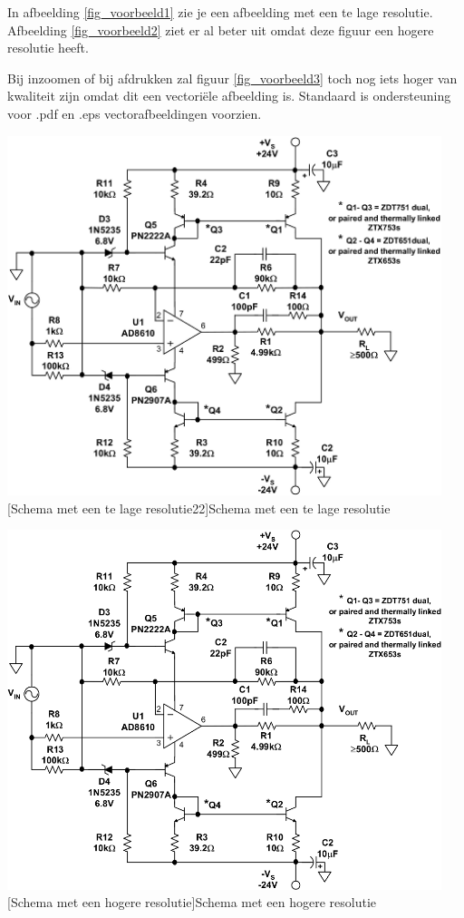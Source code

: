 In afbeelding \ref{fig_voorbeeld1} zie je een afbeelding met een te lage resolutie. Afbeelding \ref{fig_voorbeeld2} ziet er al beter uit omdat deze figuur een hogere resolutie heeft.

Bij inzoomen of bij afdrukken zal figuur \ref{fig_voorbeeld3} toch nog iets hoger van kwaliteit zijn omdat dit een vectori\"ele afbeelding is. 
Standaard is ondersteuning voor .pdf en .eps vectorafbeeldingen voorzien.

\begin{center}
\includegraphics[width=0.95\textwidth]{figures/chap2/schema.png}
[Schema met een te lage resolutie22]{Schema met een te lage resolutie\label{fig_voorbeeld1}}
\end{center}

\begin{center}
\includegraphics[width=0.95\textwidth]{figures/chap2/schema2.png}
[Schema met een hogere resolutie]{Schema met een hogere resolutie\label{fig_voorbeeld2}}
\end{center}

